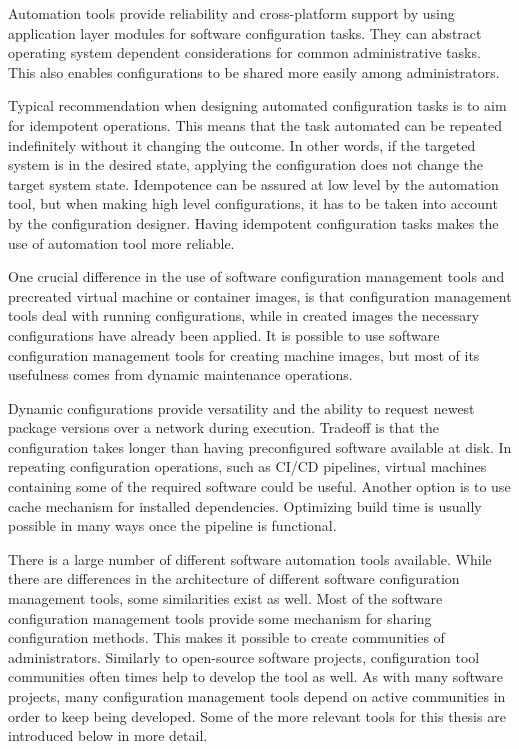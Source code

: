 Automation tools provide reliability and cross-platform support by using
application layer modules for software configuration tasks. They can abstract
operating system dependent considerations for common administrative tasks. This
also enables configurations to be shared more easily among administrators.

Typical recommendation when designing automated configuration tasks is to aim
for idempotent operations. This means that the task automated can be repeated
indefinitely without it changing the outcome. In other words, if the targeted
system is in the desired state, applying the configuration does not change the
target system state. Idempotence can be assured at low level by the automation
tool, but when making high level configurations, it has to be taken into
account by the configuration designer. Having idempotent configuration tasks
makes the use of automation tool more reliable.

One crucial difference in the use of software configuration management tools
and precreated virtual machine or container images, is that configuration
management tools deal with running configurations, while in created images the
necessary configurations have already been applied. It is possible to use
software configuration management tools for creating machine images, but most
of its usefulness comes from dynamic maintenance operations.

Dynamic configurations provide versatility and the ability to request newest
package versions over a network during execution. Tradeoff is that the
configuration takes longer than having preconfigured software available at
disk. In repeating configuration operations, such as CI/CD pipelines, virtual
machines containing some of the required software could be useful. Another
option is to use cache mechanism for installed dependencies. Optimizing build
time is usually possible in many ways once the pipeline is functional.

There is a large number of different software automation tools available. While
there are differences in the architecture of different software configuration
management tools, some similarities exist as well. Most of the software
configuration management tools provide some mechanism for sharing configuration
methods. This makes it possible to create communities of administrators.
Similarly to open-source software projects, configuration tool communities
often times help to develop the tool as well. As with many software projects,
many configuration management tools depend on active communities in order to
keep being developed. Some of the more relevant tools for this thesis are
introduced below in more detail.

